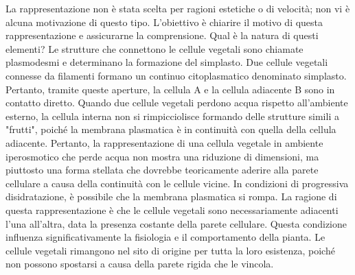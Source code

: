\documentclass[11pt, a4paper]{article}
\begin{document}
\begin{spacing}{1}
La rappresentazione non è stata scelta per ragioni estetiche o di velocità; non vi è alcuna motivazione di questo tipo. L'obiettivo è chiarire il motivo di questa rappresentazione e assicurarne la comprensione. Qual è la natura di questi elementi?
Le strutture che connettono le cellule vegetali sono chiamate plasmodesmi e determinano la formazione del simplasto. Due cellule vegetali connesse da filamenti formano un continuo citoplasmatico denominato simplasto. Pertanto, tramite queste aperture, la cellula A e la cellula adiacente B sono in contatto diretto.
Quando due cellule vegetali perdono acqua rispetto all'ambiente esterno, la cellula interna non si rimpicciolisce formando delle strutture simili a "frutti", poiché la membrana plasmatica è in continuità con quella della cellula adiacente. Pertanto, la rappresentazione di una cellula vegetale in ambiente iperosmotico che perde acqua non mostra una riduzione di dimensioni, ma piuttosto una forma stellata che dovrebbe teoricamente aderire alla parete cellulare a causa della continuità con le cellule vicine. In condizioni di progressiva disidratazione, è possibile che la membrana plasmatica si rompa. La ragione di questa rappresentazione è che le cellule vegetali sono necessariamente adiacenti l'una all'altra, data la presenza costante della parete cellulare. Questa condizione influenza significativamente la fisiologia e il comportamento della pianta. Le cellule vegetali rimangono nel sito di origine per tutta la loro esistenza, poiché non possono spostarsi a causa della parete rigida che le vincola.
\end{spacing}
\end{document}
